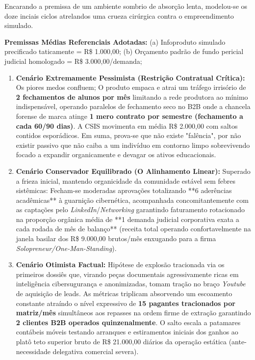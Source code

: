 \documentclass[../main.tex]{subfiles}
\begin{document}
Encarando a premissa de um ambiente sombrio de absorção lenta, modelou-se os doze inciais ciclos atrelandos uma crueza cirúrgica contra o empreendimento simulado. 

\textbf{Premissas Médias Referenciais Adotadas:} 
(a) Infoproduto simulado precificado taticamente = R\$ 1.000,00;
(b) Orçamento padrão de fundo pericial judicial homologado = R\$ 3.000,00/demanda;

\begin{enumerate}
    \item \textbf{Cenário Extremamente Pessimista (Restrição Contratual Crítica):}
    Os piores medos confluem; O produto empaca e atrai um tráfego irrisório de \textbf{2 fechamentos de alunos por mês} limitando a rede produtora ao mínimo indispensável, operando paralelos de fechamento seco no B2B onde a chancela forense de marca atinge \textbf{1 mero contrato por semestre (fechamento a cada 60/90 dias)}. A CSIS movimenta em média R\$ 2.000,00 com saltos contidos esporádicos. Em suma, prova-se que não existe "falência", por não existir passivo que não caiba a um indivíduo em contorno limpo sobrevivendo focado a expandir organicamente e devagar os ativos educacionais.
    
    \item \textbf{Cenário Conservador Equilibrado (O Alinhamento Linear):}
    Superado a frieza inicial, mantendo organicidade da comunidade estável sem febres sistêmicas: Fecham-se moderadas aprovações totalizando **6 aderências acadêmicas** à guarnição cibernética, acompanhada concomitantemente com as captações pelo \textit{LinkedIn}/\textit{Networking} garantindo faturamento rotacionado na proporção orgânica média de **1 demanda judicial corporativa exata a cada rodada de mês de balanço** (receita total operando confortavelmente na janela basilar dos R\$ 9.000,00 brutos/mês enxugando para a firma \textit{Solopreneur/One-Man-Standing}).

    \item \textbf{Cenário Otimista Factual:}
    Hipótese de explosão tracionada via os primeiros dossiês que, virando peças documentais agressivamente ricas em inteligência cibersugurança e anonimizadas, tomam tração no braço \textit{Youtube} de aquisição de leads. As métricas triplicam absorvendo um escoamento constante atraíndo o nível expressivo de \textbf{15 pagantes tracionados por matriz/mês} simultâneos aos repasses na ordem firme de extração garantindo \textbf{2 clientes B2B operados quinzenalmente}. O salto escala a patamares contábeis móveis testando arranques e estiramentos iniciais dos ganhos ao platô teto superior bruto de R\$ 21.000,00 diários da operação estática (ante-necessidade delegativa comercial severa).
\end{enumerate}
\end{document}
